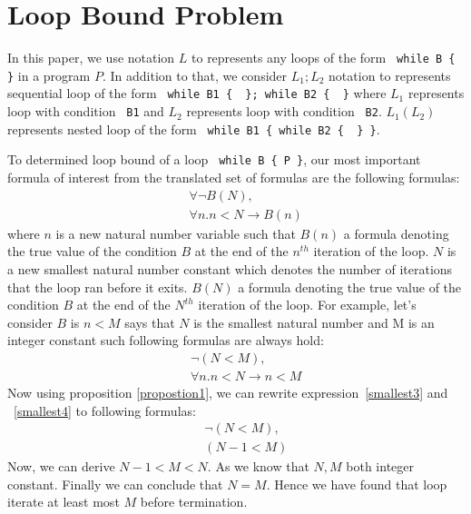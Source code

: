 \documentclass{article}
\begin{document}
\section{Loop Bound Problem}
In this paper, we use notation $L$ to represents any loops of the form \verb- while B {  }- in a program $P$. In addition to that, we consider
$L_1;L_2$ notation to represents sequential loop of the form \verb- while B1 {  }; while B2 {  }- where $L_1$ represents loop with condition \verb- B1-
and $L_2$ represents loop with condition \verb- B2-. $L_1(L_2)$ represents nested loop of the form \verb- while B1 { while B2 {  } }-.

To determined loop bound of a loop \verb- while B { P }-, our most important formula of interest from the translated set of formulas are the following formulas: 
\begin{eqnarray}
&& \forall \neg B(N), \label{smallest1}\\
&& \forall n. n< N\rightarrow  B(n) \label{smallest2}
\end{eqnarray}
where $n$ is a new natural number variable such that $B(n)$ a formula denoting the true value of the condition $B$ at the end of the $n^{th}$ iteration of the loop. $N$ is a new smallest natural number constant which 
denotes the number of iterations that the loop ran before it exits. $B(N)$ a formula denoting the true value of the condition $B$ at the end of the $N^{th}$ iteration of the loop. For example, let's consider $B$ is $n<M$ says that $N$ is the smallest natural number and M is an integer constant such following formulas are always hold:
\begin{eqnarray}
&& \neg (N<M), \label{smallest3}\\
&& \forall n. n< N\rightarrow  n<M \label{smallest4}
\end{eqnarray}
Now using proposition \ref{propostion1}, we can rewrite expression~\ref{smallest3} and ~\ref{smallest4} to following formulas:
\begin{eqnarray}
&&  \neg (N<M), \label{smallest5}\\
&& (N-1<M) \label{smallest6}
\end{eqnarray}
Now, we can derive $N-1<M<N$. As we know that $N,M$ both integer constant. Finally we can conclude that $N=M$. Hence we have found that loop iterate at least most $M$ before termination.
\end{document}
